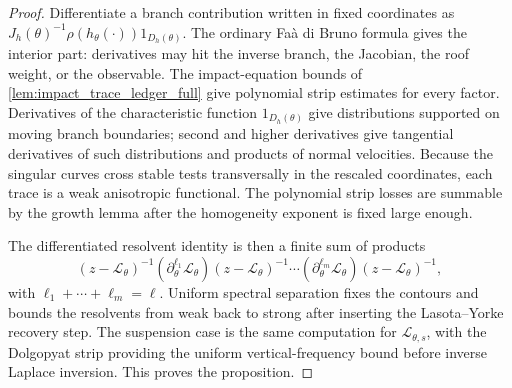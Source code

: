 \documentclass[12pt, letterpaper]{amsart}
\providecommand{\Ltransfer}{\mathscr{L}}
\theoremstyle{plain}
\theoremstyle{definition}
\theoremstyle{remark}
\begin{document}
\begin{proof}
Differentiate a branch contribution written in fixed coordinates as
\(J_h(\theta)^{-1}\rho(h_\theta(\cdot))1_{D_h(\theta)}\).  The ordinary
Fa\`a di Bruno formula gives the interior part: derivatives may hit the inverse
branch, the Jacobian, the roof weight, or the observable.  The impact-equation
bounds of \cref{lem:impact_trace_ledger_full} give polynomial strip estimates
for every factor.  Derivatives of the characteristic function
\(1_{D_h(\theta)}\) give distributions supported on moving branch boundaries;
second and higher derivatives give tangential derivatives of such distributions
and products of normal velocities.  Because the singular curves cross stable
tests transversally in the rescaled coordinates, each trace is a weak
anisotropic functional.  The polynomial strip losses are summable by the growth
lemma after the homogeneity exponent is fixed large enough.

The differentiated resolvent identity is then a finite sum of products
\begin{equation}
    (z-\Ltransfer_\theta)^{-1}
    (\partial_\theta^{\ell_1}\Ltransfer_\theta)
    (z-\Ltransfer_\theta)^{-1}
    \cdots
    (\partial_\theta^{\ell_m}\Ltransfer_\theta)
    (z-\Ltransfer_\theta)^{-1},
\end{equation}
with \(\ell_1+\cdots+\ell_m=\ell\).  Uniform spectral separation fixes the
contours and bounds the resolvents from weak back to strong after inserting the
Lasota--Yorke recovery step.  The suspension case is the same computation for
\(\Ltransfer_{\theta,s}\), with the Dolgopyat strip providing the uniform
vertical-frequency bound before inverse Laplace inversion.  This proves the
proposition.
\end{proof}
\end{document}
